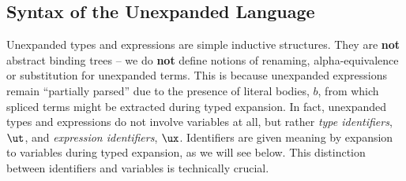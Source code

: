 \documentclass[acmsmall,10pt,review,anonymous]{acmart}\settopmatter{printfolios=true}
\begin{document}
\subsection{Syntax of the Unexpanded Language}\label{sec:syntax-U}
Unexpanded types and expressions are simple inductive structures. They are \textbf{not} abstract binding trees -- we do \textbf{not} define notions of renaming, alpha-equivalence or substitution for unexpanded terms. This is because unexpanded expressions remain ``partially parsed'' due to the presence of literal bodies, $b$, from which spliced terms might be extracted during typed expansion. In fact, unexpanded types and expressions do not involve variables at all, but rather \emph{type identifiers}, $\ut$, and \emph{expression identifiers}, $\ux$. Identifiers are given meaning by expansion to variables during typed expansion, as we will see below. This distinction between identifiers and variables is technically crucial. %

\end{document}
